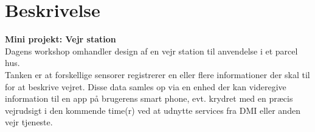 \documentclass[11pt]{article}
\renewcommand{\baselinestretch}{1.20}
\begin{document}
    
    
    
    \renewcommand{\baselinestretch}{0.8}
    \tableofcontents
    \renewcommand{\baselinestretch}{1.20}
    
    \section{Beskrivelse}
    \textbf{Mini projekt: Vejr station}\\
    Dagens workshop omhandler design af en vejr station til anvendelse i et parcel hus. \\
    Tanken er at forskellige sensorer registrerer en eller flere informationer der skal til for at beskrive
    vejret. Disse data samles op via en enhed der kan videregive information til en app på brugerens smart
    phone, evt. krydret med en præcis vejrudsigt i den kommende time(r) ved at udnytte services fra DMI
    eller anden vejr tjeneste.
    
    \newpage
    
    
    \newpage
    
    
    \newpage
    
    
    \newpage
    
    
    
\end{document}

